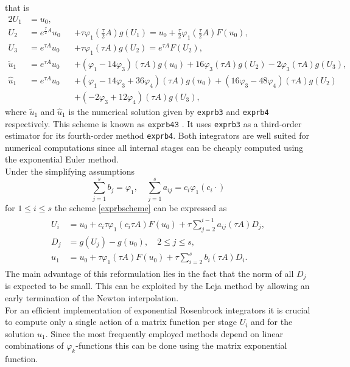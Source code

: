 \documentclass{scrartcl}
\begin{document}
	\noindent that is 
	\begin{alignat*}{2}
	U_{1} &= u_0,\\
	U_{2} &= e^{\frac{\tau}{2} A}u_0 &&+ \tau\varphi_1\left(\frac{\tau}{2} A\right)g(U_1) = u_0 + \frac{\tau}{2}\varphi_1\left(\frac{\tau}{2}A\right)F(u_0),\\
	U_{3} &= e^{\tau A}u_0 &&+ \tau\varphi_1(\tau A)g(U_2) = e^{\tau A}F(U_2),\\
	\tilde{u}_1 &= e^{\tau A}u_0 &&+ (\varphi_1 - 14\varphi_3)(\tau A)g(u_0) + 16\varphi_3(\tau A)g(U_2) - 2\varphi_3(\tau A)g(U_3),\\
	\hat{u}_1 &= e^{\tau A}u_0 &&+ (\varphi_1 - 14\varphi_3 + 36\varphi_4)(\tau A)g(u_0) + (16\varphi_3 -48\varphi_4)(\tau A)g(U_2) \\
	& &&+ (-2\varphi_3 + 12\varphi_4)(\tau A)g(U_3),
	\end{alignat*}
	where $\tilde{u}_1$ and $\hat{u}_1$ is the numerical solution given by \texttt{exprb3} and \texttt{exprb4} respectively.
	\noindent This scheme is known as $\texttt{exprb43}$ \cite[Example 2.24]{bible}. It uses \texttt{exprb3} as a third-order estimator for its fourth-order method \texttt{exprb4}. Both integrators are well suited for numerical computations since all internal stages can be cheaply computed using the exponential Euler method. \\
	Under the simplifying assumptions
	\[
	\sum_{j=1}^s b_j = \varphi_1, \quad  \sum_{j=1}^s a_{ij} = c_i\varphi_1(c_i\cdot) 
	\]
	for $1\le i\le s$ the scheme \eqref{exprbscheme} can be expressed as 
	\begin{align}
	\begin{split}
	U_i &= u_0 + c_i\tau\varphi_1(c_i \tau A)F(u_0) + \tau\sum_{j=2}^{i-1}a_{ij}(\tau A)D_j, \\
	D_j &= g(U_j) - g(u_0), \quad 2\le j\le s, \\
	u_1 &= u_0 +    \tau\varphi_1(    \tau A)F(u_0) + \tau\sum_{i=2}^{s}     b_i(\tau A)D_i.
	\end{split}\label{eq:Djscheme}
	\end{align}
	The main advantage of this reformulation lies in the fact that the norm of all $D_j$ is expected to be small. This can be exploited by the Leja method by allowing an early termination of the Newton interpolation. \\
	For an efficient implementation of exponential Rosenbrock integrators it is crucial to compute only a single action of a matrix function per stage $U_i$ and for the solution $u_1$. Since the most frequently employed methods depend on linear combinations of $\varphi_k$-functions this can be done using the matrix exponential function.
	
\end{document}
